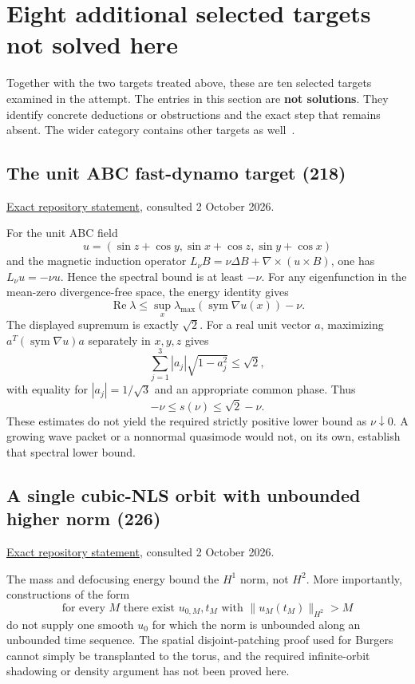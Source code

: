 \documentclass[11pt,a4paper]{article}
\numberwithin{equation}{section}
\theoremstyle{remark}\newtheorem{remark}[theorem]{Remark}
\DeclareMathOperator{\Rea}{Re}
\begin{document}
\section{Eight additional selected targets not solved here}\label{sec:remaining}
Together with the two targets treated above, these are ten selected targets examined in the attempt. The entries in this section are \textbf{not solutions}. They identify concrete deductions or obstructions and the exact step that remains absent. The wider category contains other targets as well~\cite{catalogue}.

\subsection{The unit ABC fast-dynamo target (218)}
\href{https://raw.githubusercontent.com/MColbrook/AIM/main/problems/218-abc-fast-dynamo.md}{Exact repository statement}, consulted 2 October 2026.\par
For the unit ABC field
\[
 u=(\sin z+\cos y,\sin x+\cos z,\sin y+\cos x)
\]
and the magnetic induction operator
$L_\nu B=\nu\Delta B+\nabla\times(u\times B)$,
one has $L_\nu u=-\nu u$. Hence the spectral bound is at least $-\nu$. For any eigenfunction in the mean-zero divergence-free space, the energy identity gives
\[
 \Rea\lambda\leq\sup_x\lambda_{\max}(\operatorname{sym}\nabla u(x))-\nu.
\]
The displayed supremum is exactly $\sqrt2$. For a real unit vector $a$, maximizing $a^T(\operatorname{sym}\nabla u)a$ separately in $x,y,z$ gives
\[
 \sum_{j=1}^3 |a_j|\sqrt{1-a_j^2}\leq\sqrt2,
\]
with equality for $|a_j|=1/\sqrt3$ and an appropriate common phase. Thus
\[
 -\nu\leq s(\nu)\leq\sqrt2-\nu.
\]
These estimates do not yield the required strictly positive lower bound as $\nu\downarrow0$. A growing wave packet or a nonnormal quasimode would not, on its own, establish that spectral lower bound.

\subsection{A single cubic-NLS orbit with unbounded higher norm (226)}
\href{https://raw.githubusercontent.com/MColbrook/AIM/main/problems/226-cubic-nls-unbounded-orbit.md}{Exact repository statement}, consulted 2 October 2026.\par
The mass and defocusing energy bound the $H^1$ norm, not $H^2$. More importantly, constructions of the form
\[
 \text{for every }M\text{ there exist }u_{0,M},t_M
 \text{ with }\|u_M(t_M)\|_{H^2}>M
\]
do not supply one smooth $u_0$ for which the norm is unbounded along an unbounded time sequence. The spatial disjoint-patching proof used for Burgers cannot simply be transplanted to the torus, and the required infinite-orbit shadowing or density argument has not been proved here.
\end{document}
